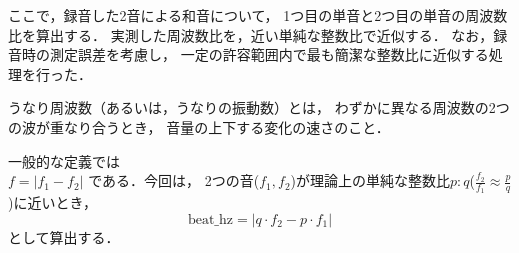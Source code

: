 \documentclass[dvipdfmx,uplatex]{beamer}
\begin{document}
\begin{frame}
  ここで，録音した2音による和音について，
  1つ目の単音と2つ目の単音の周波数比を算出する．
  実測した周波数比を，近い単純な整数比で近似する．
  なお，録音時の測定誤差を考慮し，
  一定の許容範囲内で最も簡潔な整数比に近似する処理を行った．

  \begin{table}[!ht]
    \centering
    \begin{minipage}{0.6\textwidth}
      \centering
    \end{minipage}%
    \hfill
    \begin{minipage}{0.35\textwidth}
      
      うなり周波数（あるいは，うなりの振動数）とは，
      わずかに異なる周波数の2つの波が重なり合うとき，
      音量の上下する変化の速さのこと．

      一般的な定義では\\
      $ f = |f_1 - f_2| $
      である．今回は，
      2つの音($f_1, f_2$)が理論上の単純な整数比$p:q$($\frac{f_2}{f_1} \approx \frac{p}{q}$)に近いとき，
      \[ \text{beat\_hz} = |q \cdot f_2 - p \cdot f_1| \]
      として算出する．

    \end{minipage}
  \end{table}
\end{frame}
\end{document}
